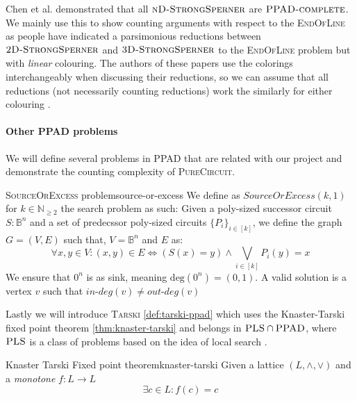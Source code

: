 Chen et al. \cite{chen_SettlingComplexityComputing_2009} demonstrated 
that all $\textsc{nD-StrongSperner}$ are $\textsc{PPAD-complete}$.
We mainly use this to show counting arguments with respect to the
\textsc{EndOfLine} as people have indicated a parsimonious reductions
between $\textsc{2D-StrongSperner}$ 
and $\textsc{3D-StrongSperner}$ to the \textsc{EndOfLine} problem but 
with \textit{linear} colouring. The authors of these papers use the colorings interchangeably when discussing their reductions,
so we can assume that all reductions (not necessarily counting reductions) work the similarly for either colouring
\cite{chen_SettlingComplexityComputing_2009, deligkas_PureCircuitTightInapproximability_2024}.


\paragraph{Other PPAD problems} 

We will define several problems in \textsc{PPAD} that are related with our project
and demonstrate the counting complexity of \textsc{PureCircuit}.

\begin{definitionbox}{\textsc{SourceOrExcess} problem}{source-or-excess}
    We define as $\textit{SourceOrExcess}(k,1)$ for $k \in \mathbb{N}_{\geq 2}$
    the search problem as such: Given a poly-sized successor circuit $S : \mathbb{B}^n$
    and a set of predecssor poly-sized circuits $\{P_i\}_{i \in [k]}$, we define
    the graph $G = (V,E)$ such that, $V = \mathbb{B}^n$ and $E$ as:
    $$
    \forall x, y \in V: (x,y) \in E \iff (S(x) = y) \wedge \bigvee_{i \in [k]} P_i(y) = x
    $$
    We ensure that $0^n$ is as sink, meaning $\text{deg}(0^n) = (0,1)$.
    A valid solution is a vertex $v$ such that $\textit{in-deg}(v) \neq \textit{out-deg}(v)$
\end{definitionbox}


Lastly we will introduce \textsc{Tarski} \ref{def:tarski-ppad}
which uses the Knaster-Tarski fixed point theorem \ref{thm:knaster-tarski} and
belongs in $\textsc{PLS} \cap \textsc{PPAD}$, where  $\textsc{PLS}$ is a class of problems based on the idea of local search \cite{johnson_HowEasyLocal_1988}.
%
%
%     
%
\begin{theorembox}{Knaster Tarski Fixed point theorem\cite{bronislaw_TheoremeFunctionsDensembles_1928, fearnley_FasterAlgorithmFinding_2022}}{knaster-tarski}
    Given a lattice $(L, \wedge, \vee)$ and a \textit{monotone} $f: L \to L$
    $$
    \exists c \in L: f(c) = c
    $$
\end{theorembox}

